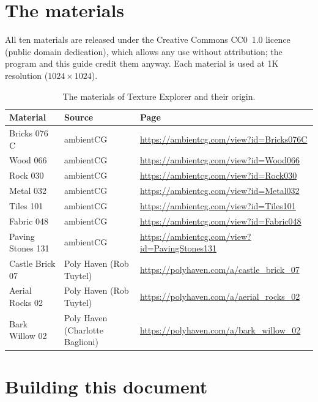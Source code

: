 \chapter{The materials}
\label{app:materials}

All ten materials are released under the Creative Commons CC0~1.0 licence (public domain
dedication), which allows any use without attribution; the program and this guide credit them
anyway. Each material is used at 1K resolution ($1024\times1024$).

\begin{table}[ht]
\centering\small
\begin{tabularx}{\linewidth}{@{}llX@{}}
\toprule
\textbf{Material} & \textbf{Source} & \textbf{Page}\\
\midrule
Bricks 076 C      & ambientCG  & \url{https://ambientcg.com/view?id=Bricks076C}\\
Wood 066          & ambientCG  & \url{https://ambientcg.com/view?id=Wood066}\\
Rock 030          & ambientCG  & \url{https://ambientcg.com/view?id=Rock030}\\
Metal 032         & ambientCG  & \url{https://ambientcg.com/view?id=Metal032}\\
Tiles 101         & ambientCG  & \url{https://ambientcg.com/view?id=Tiles101}\\
Fabric 048        & ambientCG  & \url{https://ambientcg.com/view?id=Fabric048}\\
Paving Stones 131 & ambientCG  & \url{https://ambientcg.com/view?id=PavingStones131}\\
Castle Brick 07   & Poly Haven (Rob Tuytel) & \url{https://polyhaven.com/a/castle_brick_07}\\
Aerial Rocks 02   & Poly Haven (Rob Tuytel) & \url{https://polyhaven.com/a/aerial_rocks_02}\\
Bark Willow 02    & Poly Haven (Charlotte Baglioni) & \url{https://polyhaven.com/a/bark_willow_02}\\
\bottomrule
\end{tabularx}
\caption{The materials of Texture Explorer and their origin.}
\end{table}

\chapter{Building this document}
\label{app:build}

